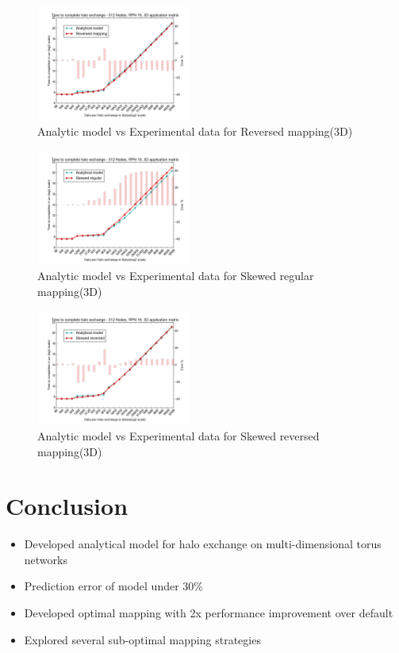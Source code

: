 \documentclass{acm_proc_article-sp}
\begin{document}
\begin{figure}
  \center
  \includegraphics[width=0.45\textwidth]{mappings/3d_reversed.png}
  \caption{Analytic model vs Experimental data for Reversed mapping(3D)}
    \label{fig:3D_reversed_mapping}
\end{figure}

\begin{figure}
  \center
  \includegraphics[width=0.45\textwidth]{mappings/3d_skewed_regular.png}
  \caption{Analytic model vs Experimental data for Skewed regular mapping(3D)}
    \label{fig:3D_skewed_regular}
\end{figure}

\begin{figure}
  \includegraphics[width=0.45\textwidth]{mappings/3d_skewed_reversed.png}
  \caption{Analytic model vs Experimental data for Skewed reversed mapping(3D)}
    \label{fig:3D_skewed_reversed}
\end{figure}

\section{Conclusion}
\begin{itemize}
  \item Developed analytical model for halo exchange on multi-dimensional torus networks
  \item Prediction error of model under 30\%
  \item Developed optimal mapping with 2x performance improvement over default
  \item Explored several sub-optimal mapping strategies
\end{itemize}
\end{document}
